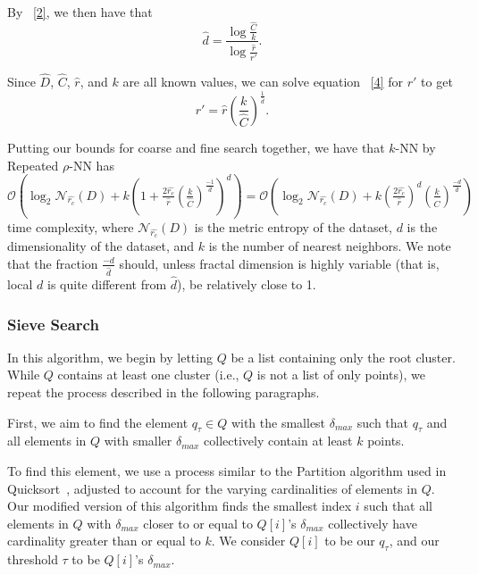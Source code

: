By ~\ref{2}, we then have that \begin{equation} \hat{d} = \frac{\log{}\frac{\hat{C}}{k}}{\log{}\frac{\hat{r}}{r'}}. \label{5} \end{equation}

Since $\hat{D}$, $\hat{C}$, $\hat{r}$, and $k$ are all known values, we can solve equation ~\ref{4} for $r'$ to get
\begin{equation} r' = \hat{r}\left(\frac{k}{\hat{C}}\right)^{\frac{1}{\hat{d}}}. \label{6} \end{equation}
    
Putting our bounds for coarse and fine search together, we have that $k$-NN by Repeated $\rho$-NN has 
$\mathcal{O}\left(\log_2{\mathcal{N}_{\hat{r_c}}(D)} + k\left(1+ \frac{2\hat{r_c}}{\hat{r}}\left(\frac{k}{\hat{C}}\right)^{\frac{-1}{\hat{d}}}\right)^d\right) = 
\mathcal{O}\left(\log_2{\mathcal{N}_{\hat{r_c}}(D)} + k\left(\frac{2\hat{r_c}}{\hat{r}}\right)^d\left(\frac{k}{\hat{C}}\right)^{\frac{-d}{\hat{d}}}\right)$ 
time complexity, where $\mathcal{N}_{\hat{r_c}}(D)$ is the metric entropy of the dataset, $d$ is the dimensionality of the dataset, and $k$ is the number of nearest neighbors. We note that the fraction $\frac{-d}{\hat{d}}$ should, unless fractal dimension is highly variable (that is, local $d$ is quite different from $\hat{d}$), be relatively close to 1.

\subsubsection{Sieve Search}
\label{subsubsec:methods:knn-search:sieve}
In this algorithm, we begin by letting $Q$ be a list containing only the root cluster. 
While $Q$ contains at least one cluster (i.e., $Q$ is not a list of only points), we repeat the process described in 
the following paragraphs. 

First, 
we aim to find the element $q_{\tau} \in Q$ with the smallest $\delta_{max}$ such that 
$q_{\tau}$ and all elements in $Q$ with smaller $\delta_{max}$ collectively contain at least $k$ points. 

To find this element, 
we use a process similar to the Partition algorithm used in Quicksort~\cite{10.1093/comjnl/5.1.10}, adjusted to account for the varying cardinalities of elements in $Q$. 
Our modified version of this algorithm finds the smallest index $i$ such 
that all elements in $Q$ with $\delta_{max}$ closer to or equal to $Q[i]$'s $\delta_{max}$ collectively have cardinality greater
than or equal to $k$. We consider $Q[i]$ to be our $q_{\tau}$, and our threshold 
$\tau$ to be $Q[i]$'s $\delta_{max}$.

